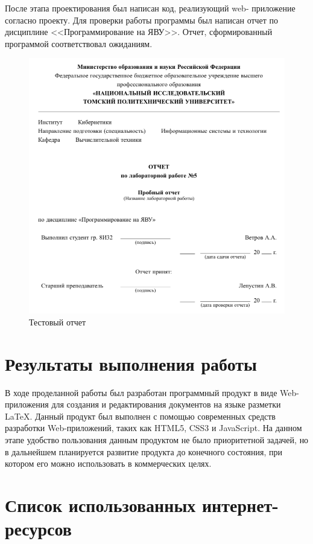 \documentclass[14pt,a4paper]{report}
\makeatletter
\newif\if@prechapterused
\let\oldchapter\chapter
\renewcommand{\chapter}[1]
{
\if@prechapterused\vspace{-2em}\@prechapterusedfalse\fi
\begingroup
	\let\clearpage\relax
	\let\cleardoublepage\relax
	\oldchapter{#1}
\endgroup
}
\makeatother
\begin{document}
После этапа проектирования был написан код, реализующий web-
приложение согласно проекту. Для проверки работы программы был написан отчет по дисциплине <<Программирование на ЯВУ>>. Отчет, сформированный программой соответствовал ожиданиям.
\begin{figure}[H]
\centerline{\includegraphics[scale=0.4]{gfx/3.png}}
\caption{Тестовый отчет}
\label{fig3}
\end{figure}

\chapter{Результаты выполнения работы}

В ходе проделанной работы был разработан программный продукт в виде Web-приложения для 
создания и редактирования документов на языке разметки LaTeX. Данный 
продукт был выполнен с помощью современных средств разработки Web-приложений, 
таких как HTML5, CSS3 и JavaScript. На данном этапе удобство пользования данным продуктом не было приоритетной задачей, но
в дальнейшем планируется развитие продукта до конечного состояния, при котором его можно использовать в коммерческих целях.

\chapter{Список использованных интернет-ресурсов}
\end{document}
